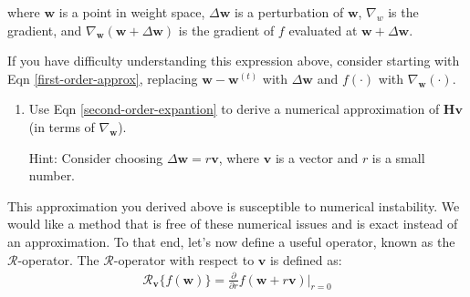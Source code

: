 where $\mathbf{w}$ is a point in weight space, $\Delta \mathbf{w}$ is a perturbation of $\mathbf{w}$, $\nabla_w$ is the gradient, and $\nabla_\mathbf{w} (\mathbf{w} + \Delta \mathbf{w})$ is the gradient of $f$ evaluated at $\mathbf{w} + \Delta \mathbf{w}$.

If you have difficulty understanding this expression above, consider starting with Eqn \ref{first-order-approx}, replacing 
$\mathbf{w} - \mathbf{w}^{(t)}$ with $\Delta \mathbf{w}$ and $f(\cdot)$ with $\nabla_\mathbf{w}(\cdot)$. 



\begin{enumerate}[resume] 
\item 
Use Eqn \ref{second-order-expantion} to derive a numerical approximation of $\mathbf{H}\mathbf{v}$ (in terms of $\nabla_{\mathbf{w}}$). 

Hint: Consider choosing $\Delta \mathbf{w} = r\mathbf{v}$, where $\mathbf{v}$ is a vector and $r$ is a small number.

\end{enumerate}
 
This approximation you derived above is susceptible to numerical instability. We would like a method that is free of these numerical issues and is exact instead of an approximation. To that end, let's now define a useful operator, known as the $\mathcal{R}$-operator. The $\mathcal{R}$-operator with respect to $\mathbf{v}$ is defined as: 
\begin{align}
    \mathcal{R}_{\mathbf{v}}\{f(\mathbf{w})\} = \frac{\partial}{\partial r} f (\mathbf{w} + r\mathbf{v})\Bigr\rvert_{r = 0}
\end{align}


 

